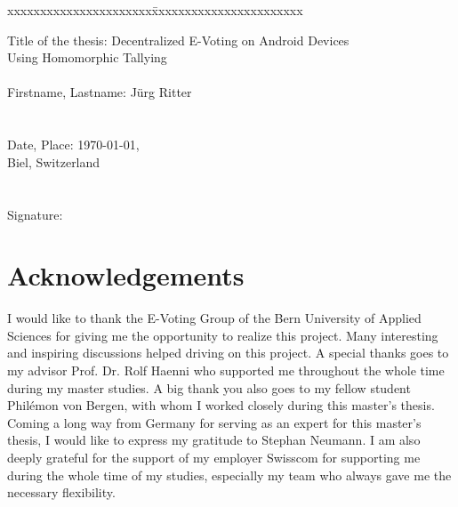 \documentclass[numbers=noenddot, abstract=on, a4paper, headsepline,
footsepline, oneside, draft=off]{scrreprt}
\begin{document}
\begin{flushleft}


\vspace{3.5cm}
\begin{tabbing}
xxxxxxxxxxxxxxxxxxxxxx\=xxxxxxxxxxxxxxxxxxxxxxx \kill

Title of the thesis:		\>  Decentralized E-Voting on Android Devices\\
 \> Using Homomorphic Tallying
\\
\\
Firstname, Lastname:		\>  Jürg Ritter		\\
\\
\\
Date, Place:		\> \today, \\
\>Biel, Switzerland			\\
\\
\\
Signature:
\end{tabbing}
\end{flushleft}

\tableofcontents
\listoffigures
\listoftables

\chapter*{Acknowledgements} I would like to thank the E-Voting Group of the Bern
University of Applied Sciences for giving me the opportunity to realize this
project. Many interesting and inspiring discussions helped driving on this
project. A special thanks goes to my advisor Prof. Dr. Rolf Haenni who supported
me throughout the whole time during my master studies. A big thank you also goes
to my fellow student Philémon von Bergen, with whom I worked closely during this
master's thesis. Coming a long way from Germany for serving as an expert for
this master's thesis, I would like to express my gratitude to Stephan Neumann.
I am also deeply grateful for the support of my employer Swisscom for supporting
me during the whole time of my studies, especially my team who always gave me
the necessary flexibility.



\end{document}
